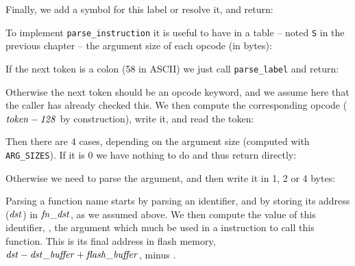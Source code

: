 
Finally, we add a symbol for this label or resolve it, and return:


To implement {\tt parse\_instruction} it is useful to have in a table -- noted
{\tt S} in the previous chapter -- the argument size of each opcode (in bytes):


If the next token is a colon (58 in ASCII) we just call {\tt parse\_label} and
return:


Otherwise the next token should be an opcode keyword, and we assume here that
the caller has already checked this. We then compute the corresponding opcode
($\it{token}-128$ by construction), write it, and read the token:


Then there are 4 cases, depending on the argument size (computed with {\tt
ARG\_SIZES}). If it is 0 we have nothing to do and thus return directly:


Otherwise we need to parse the argument, and then write it in 1, 2 or 4 bytes:


Parsing a function name starts by parsing an identifier, and by storing its
address ($\it{dst}$) in $\it{fn\_dst}$, as we assumed above. We then compute
the value of this identifier, \ie, the argument which much be used in a
 instruction to call this function. This is its final address in
flash memory, $\it{dst}-\it{dst\_buffer}+\it{flash\_buffer}$, minus
.

